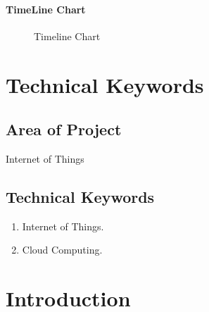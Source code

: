 \documentclass[oneside,a4paper,12pt]{report}
\begin{document}
\subsubsection{TimeLine Chart}
\begin{center}
	\begin{figure}[!htbp]
		\centering
	  \caption{Timeline Chart}
	  \label{fig:act-dig}
	\end{figure}
\end{center}  
\newpage


\chapter{Technical Keywords}
\section{Area of Project}
Internet of Things
\section{Technical Keywords}

\begin{enumerate}
	 
\item Internet of Things.
\item Cloud Computing.

\end{enumerate}

			
\chapter{Introduction}
\end{document}
